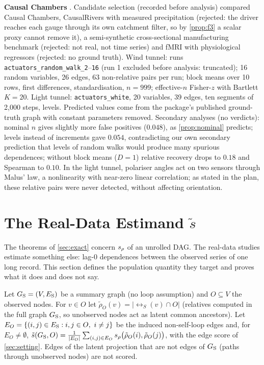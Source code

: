 \textbf{Causal Chambers} \citep{gamella2025chambers}. Candidate selection
(recorded before analysis) compared Causal Chambers, CausalRivers with
measured precipitation (rejected: the driver reaches each gauge through its
own catchment filter, so by \cref{prop:f3} a scalar proxy cannot remove it),
a semi-synthetic cross-sectional manufacturing benchmark (rejected: not real,
not time series) and fMRI with physiological regressors (rejected: no ground
truth). Wind tunnel: runs \texttt{actuators\_random\_walk\_2}--\texttt{16} (run
1 excluded before analysis: truncated); 16 random variables, 26 edges, 63
non-relative pairs per run; block means over 10 rows, first differences,
standardisation, $n=999$; effective-$n$ Fisher-$z$ with Bartlett $K=20$.
Light tunnel: \texttt{actuators\_white}, 20 variables, 39 edges, ten segments
of 2{,}000 steps, levels. Predicted values come from the package's published
ground-truth graph with constant parameters removed.
Secondary analyses (no verdicts): nominal $n$ gives slightly more false
positives ($0.048$), as \cref{prop:nominal} predicts; levels instead of
increments gave $0.054$, contradicting our own secondary prediction that
levels of random walks would produce many spurious dependences; without block
means ($D=1$) relative recovery drops to $0.18$ and Spearman to $0.10$. In the
light tunnel, polariser angles act on two sensors through Malus' law, a
nonlinearity with near-zero linear correlation; as stated in the plan, these
relative pairs were never detected, without affecting orientation.

\section{The Real-Data Estimand $\tilde s$}
\label{app:estimand}

The theorems of \cref{sec:exact} concern $s_\rho$ of an unrolled DAG. The
real-data studies estimate something else: lag-0 dependences between the
observed series of one long record. This section defines the population
quantity they target and proves what it does and does not say.

\begin{definition}[estimand]\label{def:estimand}
Let $G_{\mathrm S}=(V,E_{\mathrm S})$ be a summary graph (no loop assumption) and $O\subseteq V$
the observed nodes. For $v\in O$ let $\tilde\rho_O(v)=|\rel_S(v)\cap O|$
(relatives computed in the full graph $G_{\mathrm S}$, so unobserved nodes act as latent
common ancestors). Let $E_O=\{(i,j)\in E_{\mathrm S}:i,j\in O,\ i\ne j\}$ be the induced
non-self-loop edges and, for $E_O\neq\emptyset$,
$\tilde s(G_{\mathrm S},O)=\frac1{|E_O|}\sum_{(i,j)\in E_O}s_\rho\big(\tilde\rho_O(i),\tilde\rho_O(j)\big)$,
with the edge score of \cref{sec:setting}. Edges of the latent projection
that are not edges of $G_{\mathrm S}$ (paths through unobserved nodes) are not scored.
\end{definition}

